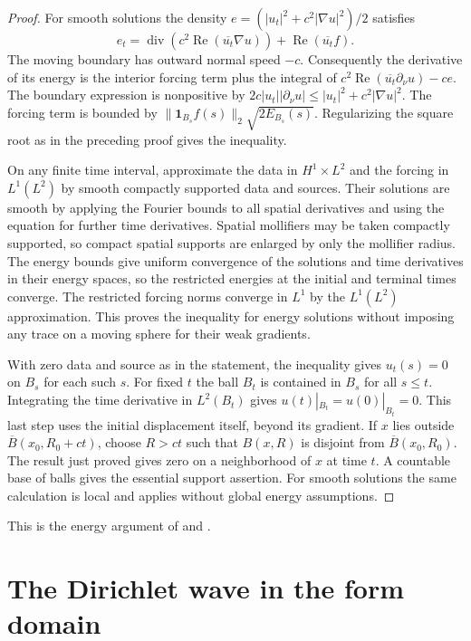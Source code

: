 \documentclass[11pt,oneside,openany]{book}
\theoremstyle{plain}
\theoremstyle{definition}
\theoremstyle{remark}
\begin{document}
\begin{proof}
For smooth solutions the density
\(e=(|u_t|^2+c^2|\nabla u|^2)/2\) satisfies
\[
 e_t=\operatorname{div}
          (c^2\operatorname{Re}(\overline{u_t}\nabla u))
        +\operatorname{Re}(\overline{u_t}f).
\]
The moving boundary has outward normal speed \(-c\).
Consequently the derivative of its energy is the interior
forcing term plus the integral of
\(c^2\operatorname{Re}(\overline{u_t}\partial_\nu u)-ce\).
The boundary expression is nonpositive by
\(2c|u_t||\partial_\nu u|\leq |u_t|^2+c^2|\nabla u|^2\).
The forcing term is bounded by
\(\|\mathbf 1_{B_s}f(s)\|_2\sqrt{2E_{B_s}(s)}\).
Regularizing the square root as in the preceding proof gives
the inequality.

On any finite time interval, approximate the data in
\(H^1\times L^2\) and the forcing in \(L^1(L^2)\) by smooth
compactly supported data and sources. Their solutions are
smooth by applying the Fourier bounds to all spatial derivatives
and using the equation for further time derivatives. Spatial
mollifiers may be taken compactly
supported, so compact spatial supports are enlarged by only
the mollifier radius. The energy bounds give uniform convergence
of the solutions and time derivatives in their energy spaces,
so the restricted energies at the initial and terminal times
converge. The restricted forcing norms converge in \(L^1\)
by the \(L^1(L^2)\) approximation. This proves the inequality
for energy solutions without imposing any trace on a moving
sphere for their weak gradients.

With zero data and source as in the statement, the inequality
gives \(u_t(s)=0\) on \(B_s\) for each such \(s\). For fixed \(t\)
the ball \(B_t\) is contained in \(B_s\) for all \(s\leq t\).
Integrating the time derivative in \(L^2(B_t)\) gives
\(u(t)|_{B_t}=u(0)|_{B_t}=0\). This last step uses the initial
displacement itself, beyond its gradient. If \(x\) lies outside
\(\overline B(x_0,R_0+ct)\), choose \(R>ct\) such that
\(B(x,R)\) is disjoint from \(\overline B(x_0,R_0)\).
The result just proved gives zero on a neighborhood of \(x\)
at time \(t\). A countable base of balls gives the essential
support assertion. For smooth solutions the same calculation
is local and applies without global energy assumptions.
\end{proof}

This is the energy argument of \cite[Section 2.4.3, Theorem 6]{Evans}
and \cite[Sections 2.2 and 9.1]{Strauss}.

\section{The Dirichlet wave in the form domain}\label{pde:W05}
\end{document}
